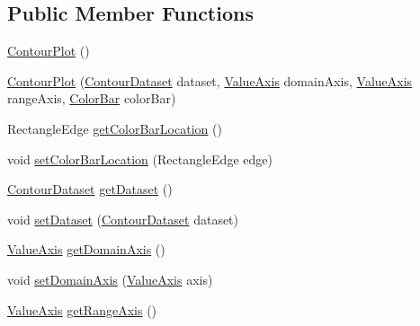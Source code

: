 \subsection*{Public Member Functions}
\begin{DoxyCompactItemize}
\item 
\mbox{\hyperlink{classorg_1_1jfree_1_1chart_1_1plot_1_1_contour_plot_aaab1fe03b476140c69ec7f269e5b72f5}{Contour\+Plot}} ()
\item 
\mbox{\hyperlink{classorg_1_1jfree_1_1chart_1_1plot_1_1_contour_plot_a5dca1e4ec8b0b8b8e455d709c90805ee}{Contour\+Plot}} (\mbox{\hyperlink{interfaceorg_1_1jfree_1_1data_1_1contour_1_1_contour_dataset}{Contour\+Dataset}} dataset, \mbox{\hyperlink{classorg_1_1jfree_1_1chart_1_1axis_1_1_value_axis}{Value\+Axis}} domain\+Axis, \mbox{\hyperlink{classorg_1_1jfree_1_1chart_1_1axis_1_1_value_axis}{Value\+Axis}} range\+Axis, \mbox{\hyperlink{classorg_1_1jfree_1_1chart_1_1axis_1_1_color_bar}{Color\+Bar}} color\+Bar)
\item 
Rectangle\+Edge \mbox{\hyperlink{classorg_1_1jfree_1_1chart_1_1plot_1_1_contour_plot_a788771145e84d1a431c992c1afc23fc7}{get\+Color\+Bar\+Location}} ()
\item 
void \mbox{\hyperlink{classorg_1_1jfree_1_1chart_1_1plot_1_1_contour_plot_a8e444614a418b17103ca94f9164ec610}{set\+Color\+Bar\+Location}} (Rectangle\+Edge edge)
\item 
\mbox{\hyperlink{interfaceorg_1_1jfree_1_1data_1_1contour_1_1_contour_dataset}{Contour\+Dataset}} \mbox{\hyperlink{classorg_1_1jfree_1_1chart_1_1plot_1_1_contour_plot_af21c24017cbe00a61aada7c01acf2d54}{get\+Dataset}} ()
\item 
void \mbox{\hyperlink{classorg_1_1jfree_1_1chart_1_1plot_1_1_contour_plot_abb2e7d56f57a35a916cefc26785bd466}{set\+Dataset}} (\mbox{\hyperlink{interfaceorg_1_1jfree_1_1data_1_1contour_1_1_contour_dataset}{Contour\+Dataset}} dataset)
\item 
\mbox{\hyperlink{classorg_1_1jfree_1_1chart_1_1axis_1_1_value_axis}{Value\+Axis}} \mbox{\hyperlink{classorg_1_1jfree_1_1chart_1_1plot_1_1_contour_plot_a3c7c415dc8cce64e5c967ec463bf37f7}{get\+Domain\+Axis}} ()
\item 
void \mbox{\hyperlink{classorg_1_1jfree_1_1chart_1_1plot_1_1_contour_plot_a9daa2294c4efa2a5e58fafc7c6e723a5}{set\+Domain\+Axis}} (\mbox{\hyperlink{classorg_1_1jfree_1_1chart_1_1axis_1_1_value_axis}{Value\+Axis}} axis)
\item 
\mbox{\hyperlink{classorg_1_1jfree_1_1chart_1_1axis_1_1_value_axis}{Value\+Axis}} \mbox{\hyperlink{classorg_1_1jfree_1_1chart_1_1plot_1_1_contour_plot_a83069c74a069e51d8464523e02d14d23}{get\+Range\+Axis}} ()

\end{DoxyCompactItemize}

